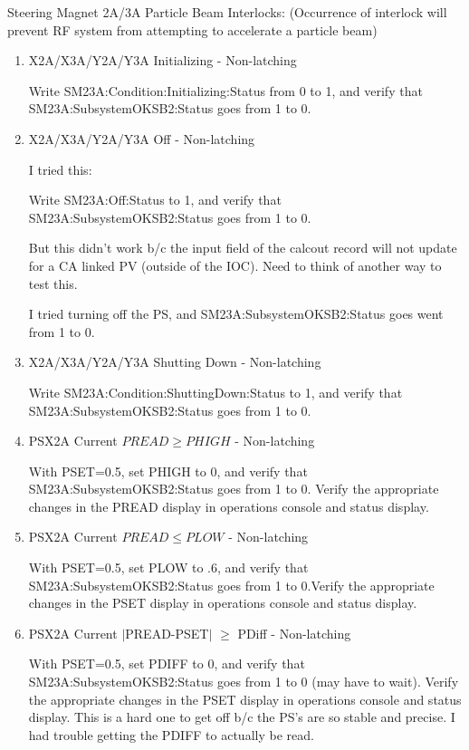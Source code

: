 \documentclass[11pt]{book}		%
\begin{document}
Steering Magnet 2A/3A Particle Beam Interlocks:
(Occurrence of interlock will prevent RF system from attempting to accelerate a particle beam)

\begin{enumerate}
 \item X2A/X3A/Y2A/Y3A Initializing - Non-latching

\color{red}
Write SM23A:Condition:Initializing:Status from 0 to 1, and verify that SM23A:SubsystemOKSB2:Status goes from 1 to 0.
\color{black}


 \item X2A/X3A/Y2A/Y3A Off - Non-latching

\color{red}
I tried this: 

Write SM23A:Off:Status to 1, and verify that SM23A:SubsystemOKSB2:Status goes from 1 to 0.

But this didn't work b/c the input field of the calcout record will not update for a CA linked PV (outside of the IOC). Need to think of another way to test this.

I tried turning off the PS, and SM23A:SubsystemOKSB2:Status goes went from 1 to 0.
\color{black}


 \item X2A/X3A/Y2A/Y3A Shutting Down - Non-latching

\color{red}
Write SM23A:Condition:ShuttingDown:Status to 1, and verify that SM23A:SubsystemOKSB2:Status goes from 1 to 0.
\color{black}


 \item PSX2A Current $PREAD \geq PHIGH$ - Non-latching

\color{red}
With PSET=0.5, set PHIGH to 0, and verify that SM23A:SubsystemOKSB2:Status goes from 1 to 0. Verify the appropriate changes in the PREAD display in operations console and status display.
\color{black}

 \item PSX2A Current $PREAD \leq PLOW$ - Non-latching

\color{red}
With PSET=0.5, set PLOW to .6, and verify that SM23A:SubsystemOKSB2:Status goes from 1 to 0.Verify the appropriate changes in the PSET display in operations console and status display.
\color{black}

 \item PSX2A Current $\mid$PREAD-PSET$\mid$  $\geq$ PDiff - Non-latching

\color{red}
With PSET=0.5, set PDIFF to 0, and verify that SM23A:SubsystemOKSB2:Status goes from 1 to 0 (may have to wait). Verify the appropriate changes in the PSET display in operations console and status display. This is a hard one to get off b/c the PS's are so stable and precise. I had trouble getting the PDIFF to actually be read.
\color{black}


\end{enumerate}
\end{document}
